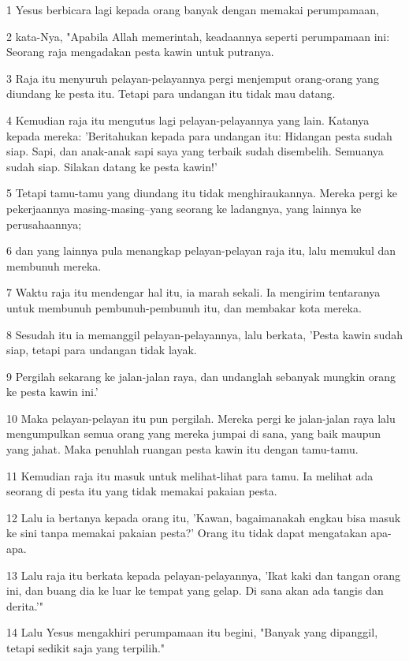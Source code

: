 \par 1 Yesus berbicara lagi kepada orang banyak dengan memakai perumpamaan,
\par 2 kata-Nya, "Apabila Allah memerintah, keadaannya seperti perumpamaan ini: Seorang raja mengadakan pesta kawin untuk putranya.
\par 3 Raja itu menyuruh pelayan-pelayannya pergi menjemput orang-orang yang diundang ke pesta itu. Tetapi para undangan itu tidak mau datang.
\par 4 Kemudian raja itu mengutus lagi pelayan-pelayannya yang lain. Katanya kepada mereka: 'Beritahukan kepada para undangan itu: Hidangan pesta sudah siap. Sapi, dan anak-anak sapi saya yang terbaik sudah disembelih. Semuanya sudah siap. Silakan datang ke pesta kawin!'
\par 5 Tetapi tamu-tamu yang diundang itu tidak menghiraukannya. Mereka pergi ke pekerjaannya masing-masing--yang seorang ke ladangnya, yang lainnya ke perusahaannya;
\par 6 dan yang lainnya pula menangkap pelayan-pelayan raja itu, lalu memukul dan membunuh mereka.
\par 7 Waktu raja itu mendengar hal itu, ia marah sekali. Ia mengirim tentaranya untuk membunuh pembunuh-pembunuh itu, dan membakar kota mereka.
\par 8 Sesudah itu ia memanggil pelayan-pelayannya, lalu berkata, 'Pesta kawin sudah siap, tetapi para undangan tidak layak.
\par 9 Pergilah sekarang ke jalan-jalan raya, dan undanglah sebanyak mungkin orang ke pesta kawin ini.'
\par 10 Maka pelayan-pelayan itu pun pergilah. Mereka pergi ke jalan-jalan raya lalu mengumpulkan semua orang yang mereka jumpai di sana, yang baik maupun yang jahat. Maka penuhlah ruangan pesta kawin itu dengan tamu-tamu.
\par 11 Kemudian raja itu masuk untuk melihat-lihat para tamu. Ia melihat ada seorang di pesta itu yang tidak memakai pakaian pesta.
\par 12 Lalu ia bertanya kepada orang itu, 'Kawan, bagaimanakah engkau bisa masuk ke sini tanpa memakai pakaian pesta?' Orang itu tidak dapat mengatakan apa-apa.
\par 13 Lalu raja itu berkata kepada pelayan-pelayannya, 'Ikat kaki dan tangan orang ini, dan buang dia ke luar ke tempat yang gelap. Di sana akan ada tangis dan derita.'"
\par 14 Lalu Yesus mengakhiri perumpamaan itu begini, "Banyak yang dipanggil, tetapi sedikit saja yang terpilih."

